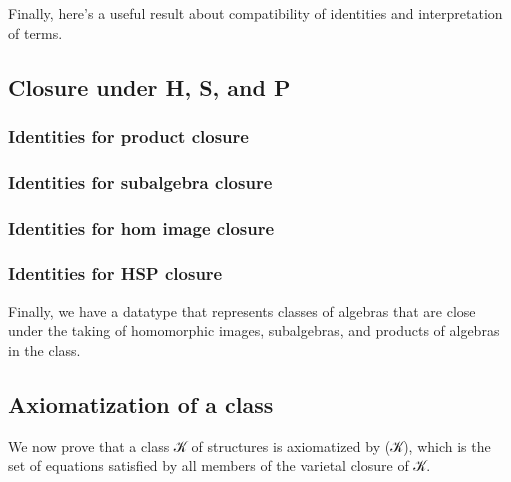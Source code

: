 \documentclass[a4paper,USenglish,cleveref,autoref,thm-restate]{lipics-v2019}
\begin{document}
Finally, here's a useful result about compatibility of identities and interpretation of terms.
\begin{code}\end{code}



\subsection{Closure under H, S, and P}\label{sec:closure-under-hsp}
\subsubsection{Identities for product closure}\label{sec:identities-for-product-closure}
\begin{code}\end{code}

\subsubsection{Identities for subalgebra closure}\label{sec:identities-for-subalgebra-closure}
\begin{code}\end{code}

\subsubsection{Identities for hom image closure}\label{sec:identities-for-hom-image-closure}
\begin{code}\end{code}

\subsubsection{Identities for HSP closure}\label{sec:identities-for-hsp-closure}
Finally, we have a datatype that represents classes of algebras that are close under the taking of homomorphic images, subalgebras, and products of algebras in the class.
\begin{code}\end{code}


\subsection{Axiomatization of a class}\label{sec:axiomatization-of-a-class}
We now prove that a class \AB 𝒦 of structures is axiomatized by \AS (\AS\AB 𝒦), which is the set of equations satisfied by all members of the varietal closure of \AB 𝒦.
\begin{code}\end{code}
\end{document}
